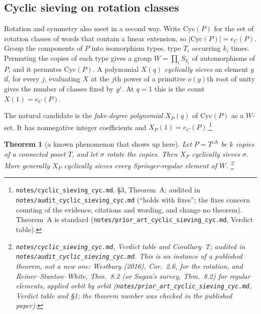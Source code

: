 \documentclass[11pt]{article}
\newtheorem{theorem}{Theorem}
\theoremstyle{definition}
\theoremstyle{remark}
\newcommand{\src}[1]{\nolinkurl{#1}}
\newcommand{\tagbox}[1]{\leavevmode\marginpar{\raggedright\fbox{\parbox{0.66in}{\centering\scriptsize\sffamily #1}}}}
\newcommand{\KNOWN}{\tagbox{KNOWN\\(INSTANCE)}}
\begin{document}
\subsection{Cyclic sieving on rotation classes}

Rotation and symmetry also meet in a second way. Write $\mathrm{Cyc}(P)$
for the set of rotation classes of words that contain a linear extension,
so $|\mathrm{Cyc}(P)|=e_C(P)$. Group the components of $P$ into isomorphism
types, type $T_i$ occurring $k_i$ times. Permuting the copies of each type
gives a group $W=\prod_iS_{k_i}$ of automorphisms of $P$, and it permutes
$\mathrm{Cyc}(P)$. A polynomial $X(q)$ \emph{cyclically sieves} an element
$g$ if, for every $j$, evaluating $X$ at the $j$th power of a primitive
$o(g)$th root of unity gives the number of classes fixed by $g^j$. At $q=1$
this is the count $X(1)=e_C(P)$.

The natural candidate is the \emph{fake-degree polynomial} $X_P(q)$ of
$\mathrm{Cyc}(P)$ as a $W$-set. It has nonnegative integer coefficients
and $X_P(1)=e_C(P)$.\footnote{\src{notes/cyclic_sieving_cyc.md}, \S3,
Theorem~A; audited in \src{notes/audit_cyclic_sieving_cyc.md} (``holds with
fixes''; the fixes concern counting of the evidence, citations and wording,
and change no theorem). Theorem~A is standard
(\src{notes/prior_art_cyclic_sieving_cyc.md}, Verdict table).}\KNOWN

\begin{theorem}[a known phenomenon that shows up here]\KNOWN
Let $P=T^{\sqcup k}$ be $k$ copies of a connected poset $T$, and let
$\sigma$ rotate the copies. Then $X_P$ cyclically sieves $\sigma$. More
generally $X_P$ cyclically sieves every Springer-regular element of $W$.%
\footnote{\src{notes/cyclic_sieving_cyc.md}, Verdict table and
Corollary~T; audited in \src{notes/audit_cyclic_sieving_cyc.md}. This is an
instance of a published theorem, not a new one: Westbury (2016), Cor.~2.6,
for the rotation, and Reiner--Stanton--White, Thm.~8.2 (or Sagan's survey,
Thm.~8.2) for regular elements, applied orbit by orbit
(\src{notes/prior_art_cyclic_sieving_cyc.md}, Verdict table and \S1; the
theorem number was checked in the published paper).}
\end{theorem}
\end{document}

